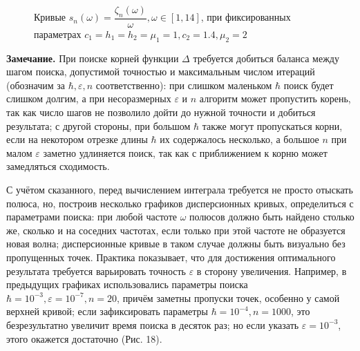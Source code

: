 \documentclass[a4paper, 12pt]{article}
\begin{document}
\begin{figure}[h!]
\noindent{}
\caption{Кривые $s_n(\omega)=\dfrac{\zeta_n(\omega)}{\omega}, \omega \in [1,14]$, при фиксированных параметрах $c_1=h_1=h_2=\mu_1=1,c_2=1.4,\mu_2=2$}
\label{figCurves}
\end{figure}

{\bf Замечание.} При поиске корней функции $\Delta$ требуется добиться баланса между шагом поиска, допустимой точностью и максимальным числом итераций (обозначим за $\hbar, \varepsilon, n$ соответственно): 
при слишком маленьком $\hbar$ поиск будет слишком долгим, а при несоразмерных $\varepsilon$ и $n$ алгоритм может пропустить корень, так как число шагов не позволило дойти до нужной точности и добиться результата;
с другой стороны, при большом $\hbar$ также могут пропускаться корни, если на некотором отрезке длины $\hbar$ их содержалось несколько, а большое $n$ при малом $\varepsilon$ заметно удлиняется поиск, так как с приближением к корню может замедляться сходимость.

С учётом сказанного, перед вычислением интеграла требуется не просто отыскать полюса, но, построив несколько графиков дисперсионных кривых, определиться с параметрами поиска: при любой частоте $\omega$ полюсов должно быть найдено столько же, сколько и на соседних частотах, если только при этой частоте не образуется новая волна; дисперсионные кривые в таком случае должны быть визуально без пропущенных точек.
Практика показывает, что для достижения оптимального результата требуется варьировать точность $\varepsilon$ в сторону увеличения. Например, в предыдущих графиках использовались параметры поиска $\hbar=10^{-3}, \varepsilon=10^{-7}, n=20$, причём заметны пропуски точек, особенно у самой верхней кривой; если зафиксировать параметры $\hbar = 10^{-4}, n=1000$, это безрезультатно увеличит время поиска в десяток раз; но если указать $\varepsilon = 10^{-3}$, этого окажется достаточно (Рис. 18).
\end{document}
